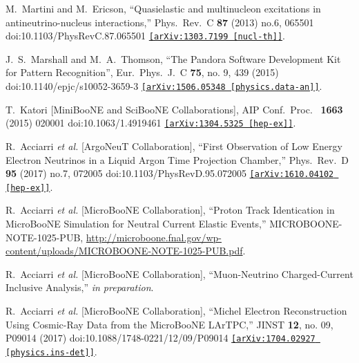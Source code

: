 \documentclass[a4paper]{article}
\begin{document}
\begin{thebibliography}{99}
  M.~Martini and M.~Ericson,
  ``Quasielastic and multinucleon excitations in antineutrino-nucleus interactions,''
  Phys.\ Rev.\ C \textbf{87} (2013) no.6,  065501
  doi:10.1103/PhysRevC.87.065501
  \href{https://arxiv.org/abs/1303.7199}{\texttt{[arXiv:1303.7199 [nucl-th]]}}.
  
   J.~S.~Marshall and M.~A.~Thomson, 
  ``The Pandora Software Development Kit for Pattern Recognition'', Eur.\ Phys.\ J.\ C \textbf{75}, no. 9, 439 (2015) doi:10.1140/epjc/s10052-3659-3 \href{https://arxiv.org/abs/1506.05348}{\texttt{[arXiv:1506.05348 [physics.data-an]]}}.
  

  


  T.~Katori [MiniBooNE and SciBooNE Collaborations],
  AIP Conf.\ Proc.\  \textbf{ 1663} (2015) 020001
  doi:10.1063/1.4919461
  \href{https://arxiv.org/abs/1304.5325}{\texttt{[arXiv:1304.5325 [hep-ex]]}}.
  
  R.~Acciarri \emph{et al.} [ArgoNeuT Collaboration],
  ``First Observation of Low Energy Electron Neutrinos in a Liquid Argon Time Projection Chamber,''
  Phys.\ Rev.\ D \textbf{ 95} (2017) no.7,  072005
  doi:10.1103/PhysRevD.95.072005
  \href{https://arxiv.org/abs/1610.04102}{\texttt{[arXiv:1610.04102 [hep-ex]]}}.
  
  R.~Acciarri \emph{et al.} [MicroBooNE Collaboration],
  ``Proton Track Identication in MicroBooNE Simulation for Neutral Current Elastic Events,'' MICROBOONE-NOTE-1025-PUB,
  \url{http://microboone.fnal.gov/wp-content/uploads/MICROBOONE-NOTE-1025-PUB.pdf}.

  R.~Acciarri \emph{et al.} [MicroBooNE Collaboration],
  ``Muon-Neutrino Charged-Current Inclusive Analysis,'' \emph{in preparation}.

  R.~Acciarri {\it et al.} [MicroBooNE Collaboration],
  ``Michel Electron Reconstruction Using Cosmic-Ray Data from the MicroBooNE LArTPC,''
  JINST {\bf 12}, no. 09, P09014 (2017)
  doi:10.1088/1748-0221/12/09/P09014
  \href{https://arxiv.org/abs/1704.02927}{\texttt{[arXiv:1704.02927 [physics.ins-det]]}}.


\end{thebibliography}
\end{document}
